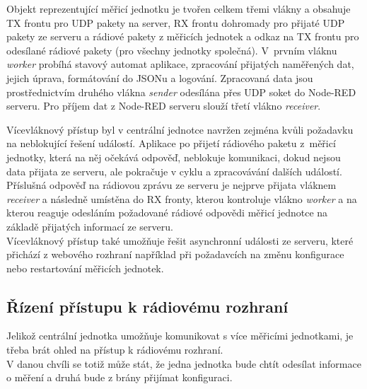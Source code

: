    Objekt reprezentující měřicí jednotku je tvořen celkem třemi vlákny a obsahuje TX frontu pro UDP pakety na server, RX frontu dohromady pro přijaté UDP pakety ze serveru a rádiové pakety z měřicích jednotek a odkaz na TX frontu pro odesílané rádiové pakety (pro všechny jednotky společná). V~prvním vláknu \textit{worker} probíhá stavový automat aplikace, zpracování přijatých naměřených dat, jejich úprava, formátování do JSONu a logování. Zpracovaná data jsou prostřednictvím druhého vlákna \textit{sender} odesílána přes UDP soket do Node-RED serveru. Pro příjem dat z Node-RED serveru slouží třetí vlákno \textit{receiver}. 
    
    Vícevláknový přístup byl v centrální jednotce navržen zejména kvůli požadavku na neblokující řešení událostí. Aplikace po přijetí rádiového paketu z~měřicí jednotky, která na něj očekává odpověď, neblokuje komunikaci, dokud nejsou data přijata ze serveru, ale pokračuje v cyklu a zpracovávání dalších událostí. Příslušná odpověď na rádiovou zprávu ze serveru je nejprve přijata vláknem \textit{receiver} a následně umístěna do RX fronty, kterou kontroluje vlákno \textit{worker} a na kterou reaguje odesláním požadované rádiové odpovědi měřicí jednotce na základě přijatých informací ze serveru.\\
    Vícevláknový přístup také umožňuje řešit asynchronní události ze serveru, které přichází z webového rozhraní například při požadavcích na změnu konfigurace nebo restartování měřicích jednotek. 


\subsection{Řízení přístupu k rádiovému rozhraní}
    Jelikož centrální jednotka umožňuje komunikovat s více měřicími jednotkami, je třeba brát ohled na přístup k rádiovému rozhraní.\\
    V danou chvíli se totiž může stát, že jedna jednotka bude chtít odesílat informace o měření a druhá bude z brány přijímat konfiguraci.
    
